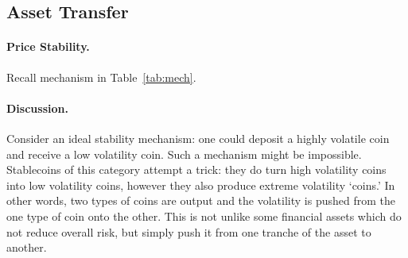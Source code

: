 \subsection{Asset Transfer}
\label{sec:basecoin}

\paragraph{Price Stability.} Recall mechanism in Table~\ref{tab:mech}.

%
%

\paragraph{Discussion.} 


Consider an ideal stability mechanism: one could deposit a highly volatile coin and receive a low volatility coin. Such a mechanism might be impossible. Stablecoins of this category attempt a trick: they do turn high volatility coins into low volatility coins, however they also produce extreme volatility `coins.' In other words, two types of coins are output and the volatility is pushed from the one type of coin onto the other. This is not unlike some financial assets which do not reduce overall risk, but simply push it from one tranche of the asset to another.

